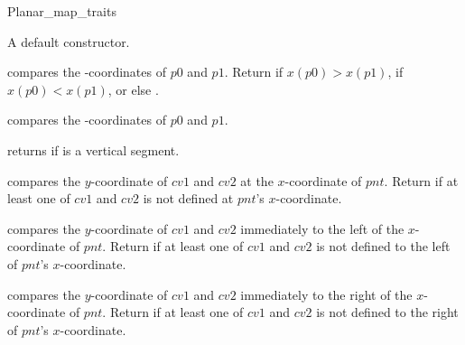 \begin{ccRefConcept}{Planar_map_traits}
    
    

    

\ccCreation
    

    {A default constructor.}

    \ccOperations

     {compares the -coordinates
       of $p0$ and $p1$.  Return  if $x(p0) >
       x(p1)$,  if $x(p0) < x(p1)$, or else
       .  }
    
     {compares the
       -coordinates of $p0$ and $p1$.}


   {returns  if  is a vertical segment.}
        
    
    {compares the $y$-coordinate of $cv1$ and $cv2$ at the $x$-coordinate 
     of $pnt$. Return  if at least one of $cv1$ and $cv2$  
     is not defined at $pnt$'s $x$-coordinate.}
   
  {compares the $y$-coordinate of $cv1$ and $cv2$ immediately to the
     left of the $x$-coordinate of $pnt$. Return 
     if at least one of $cv1$ and $cv2$ is not defined to the left of $pnt$'s
     $x$-coordinate.}
    
   {compares the $y$-coordinate of $cv1$ and
     $cv2$ immediately to the right of the $x$-coordinate of $pnt$.
     Return  if at least one of $cv1$ and $cv2$ is
     not defined to the right of $pnt$'s $x$-coordinate.}


\end{ccRefConcept}
